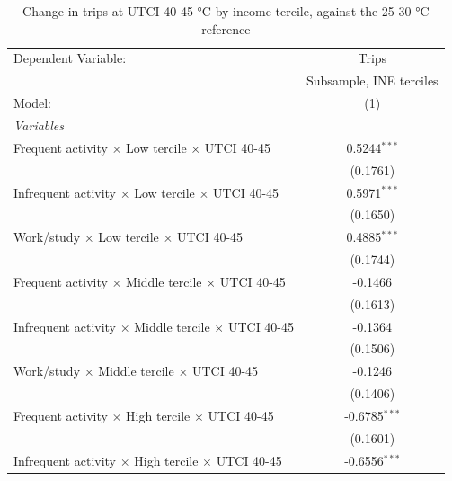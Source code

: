
\begin{table}[htbp]
   \caption{\label{table_model_d_40-45} Change in trips at UTCI 40-45 °C by income tercile, against the 25-30 °C reference}
   \centering
   \small
   \begin{tabular}{lc}
      \tabularnewline \midrule \midrule
      Dependent Variable:                                               & Trips\\  
                                                                        & Subsample, INE terciles \\   
      Model:                                                            & (1)\\  
      \midrule
      \emph{Variables}\\
      Frequent activity $\times$ Low tercile $\times$ UTCI 40-45        & 0.5244$^{***}$\\   
                                                                        & (0.1761)\\   
      Infrequent activity $\times$ Low tercile $\times$ UTCI 40-45      & 0.5971$^{***}$\\   
                                                                        & (0.1650)\\   
      Work/study $\times$ Low tercile $\times$ UTCI 40-45               & 0.4885$^{***}$\\   
                                                                        & (0.1744)\\   
      Frequent activity $\times$ Middle tercile $\times$ UTCI 40-45     & -0.1466\\   
                                                                        & (0.1613)\\   
      Infrequent activity $\times$ Middle tercile $\times$ UTCI 40-45   & -0.1364\\   
                                                                        & (0.1506)\\   
      Work/study $\times$ Middle tercile $\times$ UTCI 40-45            & -0.1246\\   
                                                                        & (0.1406)\\   
      Frequent activity $\times$ High tercile $\times$ UTCI 40-45       & -0.6785$^{***}$\\   
                                                                        & (0.1601)\\   
      Infrequent activity $\times$ High tercile $\times$ UTCI 40-45     & -0.6556$^{***}$\\   

\end{tabular}
\end{table}
